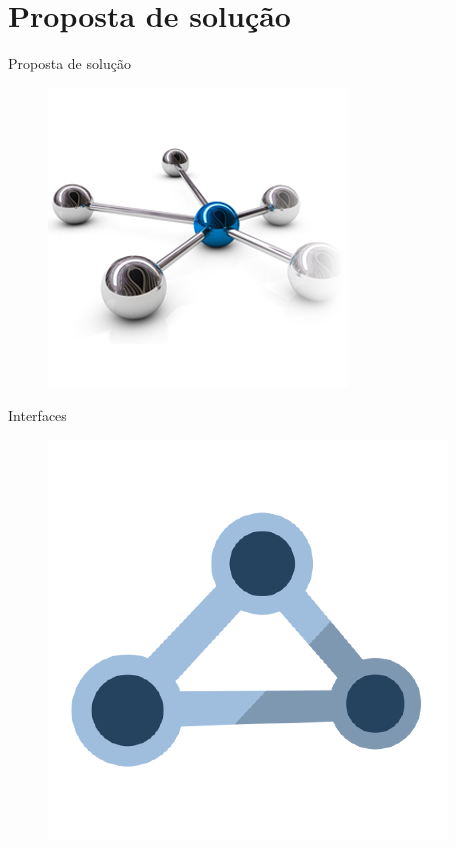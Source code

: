 \section{Proposta de solução}

\begin{frame}{Proposta de solução}

    \begin{figure}[h]
        \centering
        \includegraphics[scale=.8]{images/small-graph}
    \end{figure}
\end{frame}


\begin{frame}{Interfaces}

    \begin{figure}[h]
        \centering
        \includegraphics[scale=.4]{images/graph-interfaces}
    \end{figure}
\end{frame}
